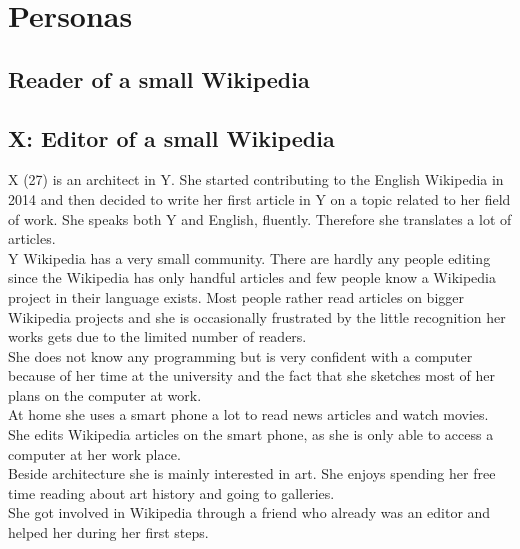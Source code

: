 \section{Personas}

\subsection{Reader of a small Wikipedia}

\subsection{X: Editor of a small Wikipedia}
X (27) is an architect in Y. She started contributing to the English Wikipedia in 2014 and then decided to write her first article in Y on a topic related to her field of work. She speaks both Y and English, fluently. Therefore she translates a lot of articles. \\
Y Wikipedia has a very small community. There are hardly any people editing since the Wikipedia has only handful articles and few people know a Wikipedia project in their language exists. Most people rather read articles on bigger Wikipedia projects and she is occasionally frustrated by the little recognition her works gets due to the limited number of readers. \\
She does not know any programming but is very confident with a computer because of her time at the university and the fact that she sketches most of her plans on the computer at work. \\
At home she uses a smart phone a lot to read news articles and watch movies. She edits Wikipedia articles on the smart phone, as she is only able to access a computer at her work place. \\  
Beside architecture she is mainly interested in art. She enjoys spending her free time reading about art history and going to galleries. \\
She got involved in Wikipedia through a friend who already was an editor and helped her during her first steps.

